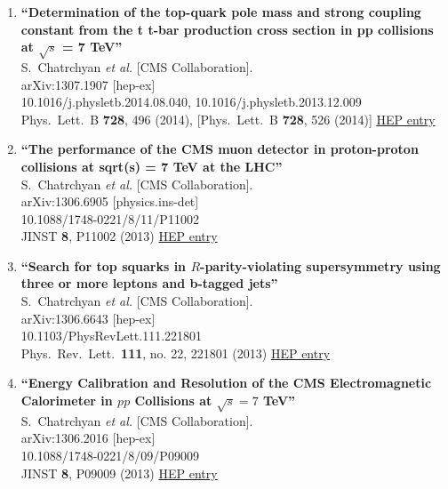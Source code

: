 \documentclass{article}
\begin{document}
\begin{enumerate}
\item%
{\bf ``Determination of the top-quark pole mass and strong coupling constant from the t t-bar production cross section in pp collisions at $\sqrt{s}$ = 7 TeV''}
  \\{}S.~Chatrchyan {\it et al.} [CMS Collaboration].
  \\{}arXiv:1307.1907 [hep-ex]
    \\{}10.1016/j.physletb.2014.08.040, 10.1016/j.physletb.2013.12.009
\\{}Phys.\ Lett.\ B {\bf 728}, 496 (2014), [Phys.\ Lett.\ B {\bf 728}, 526 (2014)] %
\href{http://inspirehep.net/record/1241819}{HEP entry}


\item%
{\bf ``The performance of the CMS muon detector in proton-proton collisions at sqrt(s) = 7 TeV at the LHC''}
  \\{}S.~Chatrchyan {\it et al.} [CMS Collaboration].
  \\{}arXiv:1306.6905 [physics.ins-det]
    \\{}10.1088/1748-0221/8/11/P11002
\\{}JINST {\bf 8}, P11002 (2013) %
\href{http://inspirehep.net/record/1240504}{HEP entry}


\item%
{\bf ``Search for top squarks in $R$-parity-violating supersymmetry using three or more leptons and b-tagged jets''}
  \\{}S.~Chatrchyan {\it et al.} [CMS Collaboration].
  \\{}arXiv:1306.6643 [hep-ex]
    \\{}10.1103/PhysRevLett.111.221801
\\{}Phys.\ Rev.\ Lett.\  {\bf 111}, no. 22, 221801 (2013) %
\href{http://inspirehep.net/record/1240497}{HEP entry}


\item%
{\bf ``Energy Calibration and Resolution of the CMS Electromagnetic Calorimeter in $pp$ Collisions at $\sqrt{s} = 7$ TeV''}
  \\{}S.~Chatrchyan {\it et al.} [CMS Collaboration].
  \\{}arXiv:1306.2016 [hep-ex]
    \\{}10.1088/1748-0221/8/09/P09009
\\{}JINST {\bf 8}, P09009 (2013) %
\href{http://inspirehep.net/record/1237915}{HEP entry}



\end{enumerate}
\end{document}
